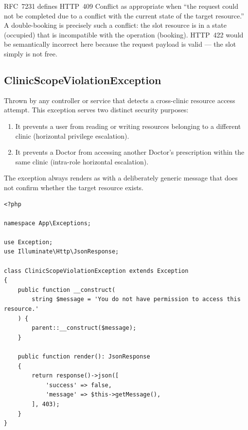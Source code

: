 \begin{notebox}
  RFC~7231 defines HTTP~409 Conflict as appropriate when ``the request
  could not be completed due to a conflict with the current state of
  the target resource.'' A double-booking is precisely such a conflict:
  the slot resource is in a state (occupied) that is incompatible with
  the operation (booking). HTTP~422 would be semantically incorrect here
  because the request payload is valid --- the slot simply is not free.
\end{notebox}

\subsection{ClinicScopeViolationException}
\label{sec:ex-clinic-scope}

Thrown by any controller or service that detects a cross-clinic resource
access attempt. This exception serves two distinct security purposes:

\begin{enumerate}
  \item It prevents a user from reading or writing resources belonging to
    a different clinic (horizontal privilege escalation).
  \item It prevents a Doctor from accessing another Doctor's prescription
    within the same clinic (intra-role horizontal escalation).
\end{enumerate}

The exception always renders as \stforbid{} with a deliberately generic
message that does not confirm whether the target resource exists.

\begin{lstlisting}[style=php, caption={\texttt{app/Exceptions/ClinicScopeViolationException.php}.}]
<?php

namespace App\Exceptions;

use Exception;
use Illuminate\Http\JsonResponse;

class ClinicScopeViolationException extends Exception
{
    public function __construct(
        string $message = 'You do not have permission to access this resource.'
    ) {
        parent::__construct($message);
    }

    public function render(): JsonResponse
    {
        return response()->json([
            'success' => false,
            'message' => $this->getMessage(),
        ], 403);
    }
}
\end{lstlisting}

